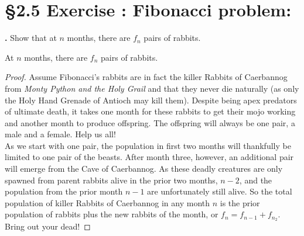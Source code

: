 \documentclass[a4paper,11pt]{article}
\begin{document}
\newpage

\setcounter{ProblemCounter}{4}
\section*{\S 2.5 Exercise : Fibonacci problem:}
\setcounter{SubsectionCounter}{1}
\textbf{.}
Show that at \(n\) months, there are \(f_n\) pairs of rabbits.
\begin{theorem1}
 At \(n\) months, there are \(f_n\) pairs of rabbits.
\begin{proof}
Assume Fibonacci's rabbits are in fact the killer Rabbits of Caerbannog from 
\textit{Monty Python and the Holy Grail} and that they never die naturally (as only the Holy Hand Grenade of Antioch may kill them). Despite being 
apex predators of ultimate death, it takes one month for these rabbits to get their 
mojo working and another month to produce offspring. The offspring will always be one pair, a male and a female. Help us all!\\
As we start with one pair, the population in first two months will thankfully be limited 
to one pair of the beasts. After month three, however, an additional pair will emerge from the Cave of Caerbannog. As these deadly creatures 
are only spawned from parent rabbits alive in the prior two months, \({n-2}\), and 
the population from the prior month \(n-1\) are unfortunately still alive. So
the total population of killer Rabbits of Caerbannog in any month \(n\) is the prior population of rabbits plus the new rabbits of the month, or \(f_n = 
f_{n-1}+f_{n_2}\). Bring out your dead!
\end{proof}  
\end{theorem1}

\newpage

\setcounter{ProblemCounter}{4}
\end{document}
